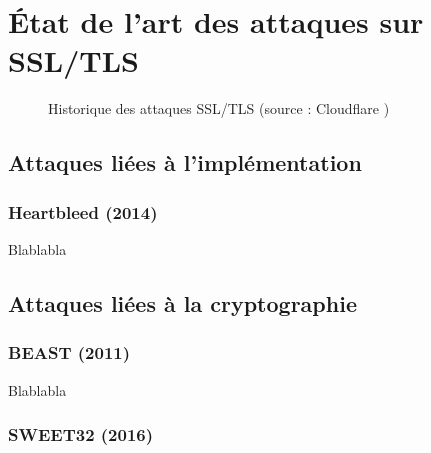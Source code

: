 \chapter{État de l'art des attaques sur SSL/TLS}

\begin{figure}[H]
  \caption{Historique des attaques SSL/TLS (source : Cloudflare \cite{cloudflare})}
\end{figure}

\section{Attaques liées à l'implémentation}

\subsection{Heartbleed (2014)}

Blablabla \cite{heartbleed}

\section{Attaques liées à la cryptographie}

\subsection{BEAST (2011)}

Blablabla \cite{beast}

\subsection{SWEET32 (2016)}

